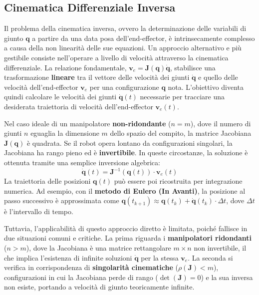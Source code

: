 ﻿\documentclass[11pt, a4paper]{article}
\begin{document}
\newpage

\subsection{Cinematica Differenziale Inversa}
Il problema della cinematica inversa, ovvero la determinazione delle variabili di giunto \(\bm{q}\) a partire da una data posa dell'end-effector, è intrinsecamente complesso a causa della non linearità delle sue equazioni. Un approccio alternativo e più gestibile consiste nell'operare a livello di velocità attraverso la cinematica differenziale. La relazione fondamentale, \(\bm{v}_e = \bm{J}(\bm{q})\dot{\bm{q}}\), stabilisce una trasformazione \textbf{lineare} tra il vettore delle velocità dei giunti \(\dot{\bm{q}}\) e quello delle velocità dell'end-effector \(\bm{v}_e\) per una configurazione \(\bm{q}\) nota. L'obiettivo diventa quindi calcolare le velocità dei giunti \(\dot{\bm{q}}(t)\) necessarie per tracciare una desiderata traiettoria di velocità dell'end-effector \(\bm{v}_e(t)\).

Nel caso ideale di un manipolatore \textbf{non-ridondante} (\(n=m\)), dove il numero di giunti \(n\) eguaglia la dimensione \(m\) dello spazio del compito, la matrice Jacobiana \(\bm{J}(\bm{q})\) è quadrata. Se il robot opera lontano da configurazioni singolari, la Jacobiana ha rango pieno ed è \textbf{invertibile}. In queste circostanze, la soluzione è ottenuta tramite una semplice inversione algebrica:
\[
    \dot{\bm{q}}(t) = \bm{J}^{-1}(\bm{q}(t)) \cdot \bm{v}_e(t)
\]
La traiettoria delle posizioni \(\bm{q}(t)\) può essere poi ricostruita per integrazione numerica. Ad esempio, con il \textbf{metodo di Eulero (In Avanti)}, la posizione al passo successivo è approssimata come \(\bm{q}(t_{k+1}) \approx \bm{q}(t_k) + \dot{\bm{q}}(t_k) \cdot \Delta t\), dove \(\Delta t\) è l'intervallo di tempo.

Tuttavia, l'applicabilità di questo approccio diretto è  limitata, poiché fallisce in due situazioni comuni e critiche. La prima riguarda i \textbf{manipolatori ridondanti} (\(n > m\)), dove la Jacobiana è una matrice rettangolare \(m \times n\) non invertibile, il che implica l'esistenza di infinite soluzioni \(\dot{\bm{q}}\) per la stessa \(\bm{v}_e\). La seconda si verifica in corrispondenza di \textbf{singolarità cinematiche} (\(\rho(\bm{J}) < m\)), configurazioni in cui la Jacobiana perde di rango (\(\det(\bm{J}) = 0\)) e la sua inversa non esiste, portando a velocità di giunto teoricamente infinite.
\end{document}

